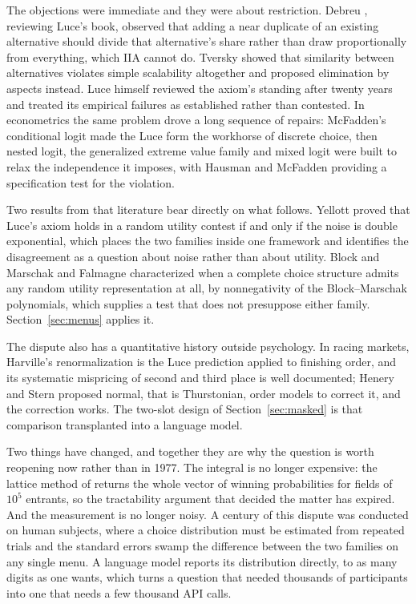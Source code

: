 \documentclass[11pt]{article}
\begin{document}
The objections were immediate and they were about restriction. Debreu
\cite{debreu1960}, reviewing Luce's book, observed that adding a near
duplicate of an existing alternative should divide that alternative's share
rather than draw proportionally from everything, which IIA cannot do. Tversky
\cite{tversky1972} showed that similarity between alternatives violates
simple scalability altogether and proposed elimination by aspects instead.
Luce \cite{luce1977} himself reviewed the axiom's standing after twenty
years and treated its empirical failures as established rather than
contested. In econometrics the same problem drove a long sequence of
repairs: McFadden's conditional logit \cite{mcfadden1974} made the Luce form
the workhorse of discrete choice, then nested logit, the generalized extreme
value family and mixed logit \cite{mcfaddentrain2000} were built to relax
the independence it imposes, with Hausman and McFadden
\cite{hausman1984} providing a specification test for the violation.

Two results from that literature bear directly on what follows. Yellott
\cite{yellott1977} proved that Luce's axiom holds in a random utility
contest if and only if the noise is double exponential, which places the two
families inside one framework and identifies the disagreement as a question
about noise rather than about utility. Block and Marschak
\cite{block1960} and Falmagne \cite{falmagne1978} characterized when a
complete choice structure admits any random utility representation at all, by
nonnegativity of the Block--Marschak polynomials, which supplies a test that
does not presuppose either family. Section~\ref{sec:menus} applies it.

The dispute also has a quantitative history outside psychology. In racing
markets, Harville's renormalization \cite{harville1973} is the Luce
prediction applied to finishing order, and its systematic mispricing of
second and third place is well documented; Henery \cite{henery1981} and
Stern \cite{stern1990} proposed normal, that is Thurstonian, order models to
correct it, and the correction works. The two-slot design of
Section~\ref{sec:masked} is that comparison transplanted into a language
model.

Two things have changed, and together they are why the question is worth
reopening now rather than in 1977. The integral is no longer expensive: the
lattice method of \cite{cotton2021} returns the whole vector of winning
probabilities for fields of $10^5$ entrants, so the tractability argument that
decided the matter has expired. And the measurement is no longer noisy. A
century of this dispute was conducted on human subjects, where a choice
distribution must be estimated from repeated trials and the standard errors
swamp the difference between the two families on any single menu. A language
model reports its distribution directly, to as many digits as one wants, which
turns a question that needed thousands of participants into one that needs a
few thousand API calls.
\end{document}
